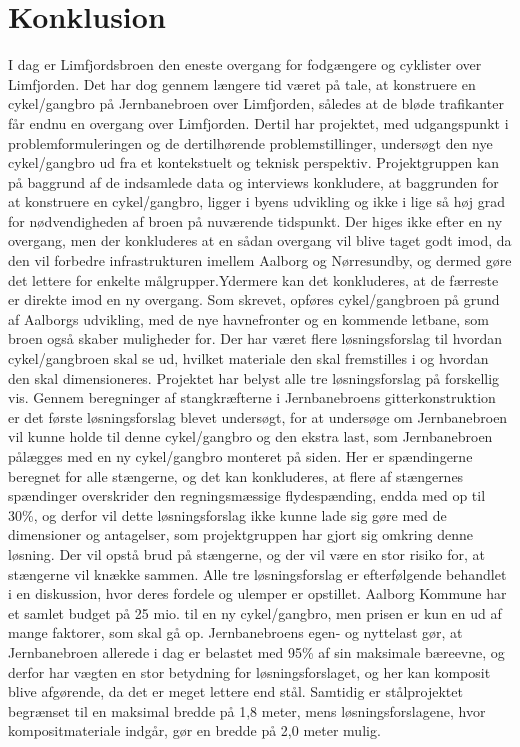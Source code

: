 \chapter{Konklusion}
I dag er Limfjordsbroen den eneste overgang for fodgængere og cyklister over Limfjorden. Det har dog gennem længere tid været på tale, at konstruere en cykel/gangbro på Jernbanebroen over Limfjorden, således at de bløde trafikanter får endnu en overgang over Limfjorden. Dertil har projektet, med udgangspunkt i problemformuleringen og de dertilhørende problemstillinger, undersøgt den nye cykel/gangbro ud fra et kontekstuelt og teknisk perspektiv. 
\newline
\newline
Projektgruppen kan på baggrund af de indsamlede data og interviews konkludere, at baggrunden for at konstruere en cykel/gangbro, ligger i byens udvikling og ikke i lige så høj grad for nødvendigheden af broen på nuværende tidspunkt. Der higes ikke efter en ny overgang, men der konkluderes at en sådan overgang vil blive taget godt imod, da den vil forbedre infrastrukturen imellem Aalborg og Nørresundby, og dermed gøre det lettere for enkelte målgrupper.Ydermere kan det konkluderes, at de færreste er direkte imod en ny overgang. Som skrevet, opføres cykel/gangbroen på grund af Aalborgs udvikling, med de nye havnefronter og en kommende letbane, som broen også skaber muligheder for.
\newline
\newline
Der har været flere løsningsforslag til hvordan cykel/gangbroen skal se ud, hvilket materiale den skal fremstilles i og hvordan den skal dimensioneres. Projektet har belyst alle tre løsningsforslag på forskellig vis. 
\newline \indent{     }  Gennem beregninger af stangkræfterne i Jernbanebroens gitterkonstruktion er det første løsningsforslag blevet undersøgt, for at undersøge om Jernbanebroen vil kunne holde til denne cykel/gangbro og den ekstra last, som Jernbanebroen pålægges med en ny cykel/gangbro monteret på siden. Her er spændingerne beregnet for alle stængerne, og det kan konkluderes, at flere af stængernes spændinger overskrider den regningsmæssige flydespænding, endda med op til 30\%, og derfor vil dette løsningsforslag ikke kunne lade sig gøre med de dimensioner og antagelser, som projektgruppen har gjort sig omkring denne løsning. Der vil opstå brud på stængerne, og der vil være en stor risiko for, at stængerne vil knække sammen. 
\newline \indent{     }  Alle tre løsningsforslag er efterfølgende behandlet i en diskussion, hvor deres fordele og ulemper er opstillet. Aalborg Kommune har et samlet budget på 25 mio. til en ny cykel/gangbro, men prisen er kun en ud af mange faktorer, som skal gå op. Jernbanebroens egen- og nyttelast gør, at Jernbanebroen allerede i dag er belastet med 95\% af sin maksimale bæreevne, og derfor har vægten en stor betydning for løsningsforslaget, og her kan komposit blive afgørende, da det er meget lettere end stål. Samtidig er stålprojektet begrænset til en maksimal bredde på 1,8 meter, mens løsningsforslagene, hvor kompositmateriale indgår, gør en bredde på 2,0 meter mulig. 

